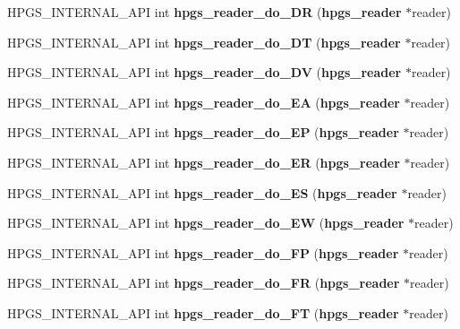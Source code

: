 \begin{DoxyCompactItemize}
\item 
HPGS\_\-INTERNAL\_\-API int {\bfseries hpgs\_\-reader\_\-do\_\-DR} ({\bf hpgs\_\-reader} $\ast$reader)\label{group__reader_ga6fde6f8a776473acf6683ced91415743}

\item 
HPGS\_\-INTERNAL\_\-API int {\bfseries hpgs\_\-reader\_\-do\_\-DT} ({\bf hpgs\_\-reader} $\ast$reader)\label{group__reader_ga53fd0eac606f85f5a523f3b0e8eca709}

\item 
HPGS\_\-INTERNAL\_\-API int {\bfseries hpgs\_\-reader\_\-do\_\-DV} ({\bf hpgs\_\-reader} $\ast$reader)\label{group__reader_ga67a3da5778ba2345bcd7850ee1f3cf9c}

\item 
HPGS\_\-INTERNAL\_\-API int {\bfseries hpgs\_\-reader\_\-do\_\-EA} ({\bf hpgs\_\-reader} $\ast$reader)\label{group__reader_ga56f851fe681986c554fd9d7ecc922b46}

\item 
HPGS\_\-INTERNAL\_\-API int {\bfseries hpgs\_\-reader\_\-do\_\-EP} ({\bf hpgs\_\-reader} $\ast$reader)\label{group__reader_ga0bb9c47666480d821eee966fe07f8dee}

\item 
HPGS\_\-INTERNAL\_\-API int {\bfseries hpgs\_\-reader\_\-do\_\-ER} ({\bf hpgs\_\-reader} $\ast$reader)\label{group__reader_gaa828610be5d48b3e772dfc7b271c45c8}

\item 
HPGS\_\-INTERNAL\_\-API int {\bfseries hpgs\_\-reader\_\-do\_\-ES} ({\bf hpgs\_\-reader} $\ast$reader)\label{group__reader_gafed23058d33ebc96a782b855eb4f92e4}

\item 
HPGS\_\-INTERNAL\_\-API int {\bfseries hpgs\_\-reader\_\-do\_\-EW} ({\bf hpgs\_\-reader} $\ast$reader)\label{group__reader_gae28138f75961e023bcfd78e64fc5ceee}

\item 
HPGS\_\-INTERNAL\_\-API int {\bfseries hpgs\_\-reader\_\-do\_\-FP} ({\bf hpgs\_\-reader} $\ast$reader)\label{group__reader_ga12b7528135c3ec735ade1c16de31fc07}

\item 
HPGS\_\-INTERNAL\_\-API int {\bfseries hpgs\_\-reader\_\-do\_\-FR} ({\bf hpgs\_\-reader} $\ast$reader)\label{group__reader_gab9a653b9eb8e015b7ebcb70f90a05910}

\item 
HPGS\_\-INTERNAL\_\-API int {\bfseries hpgs\_\-reader\_\-do\_\-FT} ({\bf hpgs\_\-reader} $\ast$reader)\label{group__reader_gaa708b9b01fd1206552a0d29d2e0577a7}


\end{DoxyCompactItemize}
